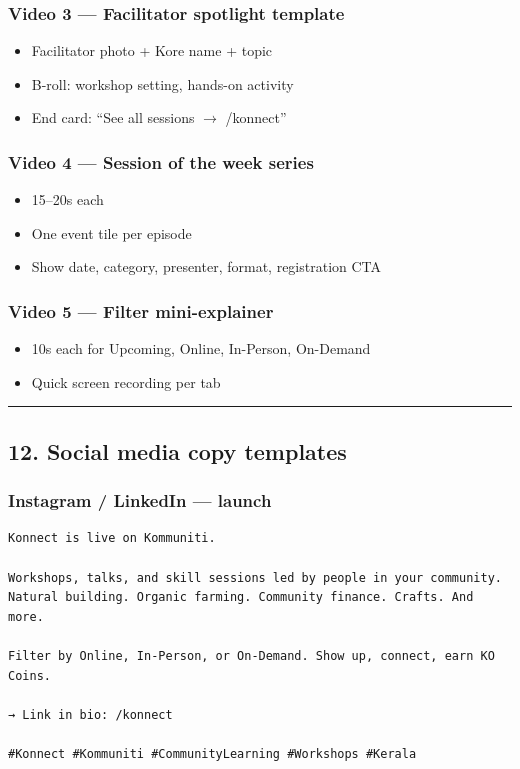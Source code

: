 \documentclass[11pt,a4paper]{report}
\begin{document}
\subsubsection{Video 3 --- Facilitator spotlight template}
\begin{itemize}
  \item Facilitator photo + Kore name + topic
  \item B-roll: workshop setting, hands-on activity
  \item End card: “See all sessions $\rightarrow$ /konnect”
\end{itemize}

\subsubsection{Video 4 --- Session of the week series}
\begin{itemize}
  \item 15--20s each
  \item One event tile per episode
  \item Show date, category, presenter, format, registration CTA
\end{itemize}

\subsubsection{Video 5 --- Filter mini-explainer}
\begin{itemize}
  \item 10s each for Upcoming, Online, In-Person, On-Demand
  \item Quick screen recording per tab
\end{itemize}

\medskip\hrule\medskip

\subsection{12. Social media copy templates}

\subsubsection{Instagram / LinkedIn --- launch}
\begin{verbatim}
Konnect is live on Kommuniti.

Workshops, talks, and skill sessions led by people in your community.
Natural building. Organic farming. Community finance. Crafts. And more.

Filter by Online, In-Person, or On-Demand. Show up, connect, earn KO Coins.

→ Link in bio: /konnect

#Konnect #Kommuniti #CommunityLearning #Workshops #Kerala
\end{verbatim}
\end{document}
